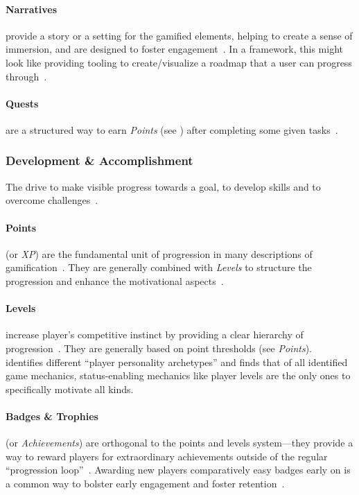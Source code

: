 \documentclass[runningheads]{llncs}
\begin{document}
\paragraph{Narratives} provide a story or a setting for the gamified elements, helping to create a sense of immersion, and are designed to foster engagement~\cite{MRGA15}. In a framework, this might look like providing tooling to create/visualize a roadmap that a user can progress through~\cite{SaHMM17}.

\paragraph{Quests} are a structured way to earn \emph{Points} (see ) after completing some given tasks~\cite{ZichC11}.

\subsubsection{Development \& Accomplishment\label{sec:development-accomplishment}} The drive to make visible progress towards a goal, to develop skills and to overcome challenges~\cite{Chou15}.

\paragraph{Points} (or \emph{XP}) are the fundamental unit of progression in many descriptions of gamification~\cite{DeDKN11, SaHMM17, XiZIA18, ZichC11, Yongw15}. They are generally combined with \emph{Levels} to structure the progression and enhance the motivational aspects~\cite{SaHMM17}.

\paragraph{Levels} increase player's competitive instinct by providing a clear hierarchy of progression~\cite{DeDKN11, Yongw15}. They are generally based on point thresholds (see \emph{Points}).~\cite{Yongw15} identifies different \enquote{player personality archetypes} and finds that of all identified game mechanics, status-enabling mechanics like player levels are the only ones to specifically motivate all kinds.

\paragraph{Badges \& Trophies} (or \emph{Achievements}) are orthogonal to the points and levels system---they provide a way to reward players for extraordinary achievements outside of the regular \enquote{progression loop}~\cite{SaHMM17, ZichC11, Yongw15}. Awarding new players comparatively easy badges early on is a common way to bolster early engagement and foster retention~\cite{CoGS19}.
\end{document}
